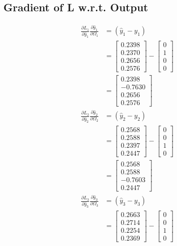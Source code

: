 \documentclass{article}
\begin{document}
\subsection{Gradient of L w.r.t. Output}
\begin{align*}
\frac{\partial L_1}{\partial \hat{y}_1}\frac{\partial \hat{y}_1}{\partial \Omega_1} &= (\hat{y}_{1}-y_{1})\\
&= \begin{bmatrix} 0.2398 \\ 0.2370 \\ 0.2656 \\ 0.2576 \end{bmatrix} - \begin{bmatrix} 0 \\ 1 \\ 0 \\ 0 \end{bmatrix} \\
&=\begin{bmatrix} 0.2398 \\ -0.7630 \\ 0.2656 \\ 0.2576 \end{bmatrix}  \\
\frac{\partial L_2}{\partial \hat{y}_2}\frac{\partial \hat{y}_2}{\partial \Omega_2} &= (\hat{y}_{2}-y_{2})\\
&= \begin{bmatrix} 0.2568 \\ 0.2588 \\ 0.2397 \\ 0.2447 \end{bmatrix} - \begin{bmatrix} 0 \\ 0 \\ 1 \\ 0 \end{bmatrix}\\
&= \begin{bmatrix} 0.2568 \\ 0.2588 \\ -0.7603 \\ 0.2447 \end{bmatrix} \\
\frac{\partial L_3}{\partial \hat{y}_3}\frac{\partial \hat{y}_3}{\partial \Omega_3} &= (\hat{y}_{3}-y_{3})\\
&= \begin{bmatrix} 0.2663 \\ 0.2714 \\ 0.2254 \\ 0.2369 \end{bmatrix} - \begin{bmatrix} 0 \\ 0 \\ 1 \\ 0 \end{bmatrix}\\

\end{align*}
\end{document}
